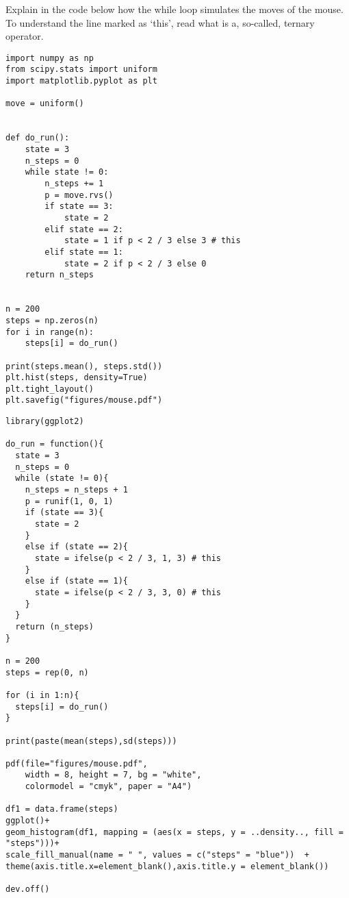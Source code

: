 \begin{exercise}
Explain in the code below how the while loop simulates the moves of the mouse.  To understand the line marked as `this', read what is a, so-called, ternary operator.
\begin{verbatim}
import numpy as np
from scipy.stats import uniform
import matplotlib.pyplot as plt

move = uniform()


def do_run():
    state = 3
    n_steps = 0
    while state != 0:
        n_steps += 1
        p = move.rvs()
        if state == 3:
            state = 2
        elif state == 2:
            state = 1 if p < 2 / 3 else 3 # this
        elif state == 1:
            state = 2 if p < 2 / 3 else 0
    return n_steps


n = 200
steps = np.zeros(n)
for i in range(n):
    steps[i] = do_run()

print(steps.mean(), steps.std())
plt.hist(steps, density=True)
plt.tight_layout()
plt.savefig("figures/mouse.pdf")
\end{verbatim}

\begin{verbatim}
library(ggplot2)

do_run = function(){
  state = 3
  n_steps = 0
  while (state != 0){
    n_steps = n_steps + 1
    p = runif(1, 0, 1)
    if (state == 3){
      state = 2
    }
    else if (state == 2){
      state = ifelse(p < 2 / 3, 1, 3) # this
    }
    else if (state == 1){
      state = ifelse(p < 2 / 3, 3, 0) # this
    }
  }
  return (n_steps)
}

n = 200
steps = rep(0, n)

for (i in 1:n){
  steps[i] = do_run()
}

print(paste(mean(steps),sd(steps)))

pdf(file="figures/mouse.pdf",
    width = 8, height = 7, bg = "white",
    colormodel = "cmyk", paper = "A4")

df1 = data.frame(steps)
ggplot()+
geom_histogram(df1, mapping = (aes(x = steps, y = ..density.., fill = "steps")))+
scale_fill_manual(name = " ", values = c("steps" = "blue"))  +
theme(axis.title.x=element_blank(),axis.title.y = element_blank())

dev.off()
\end{verbatim}

\end{exercise}
